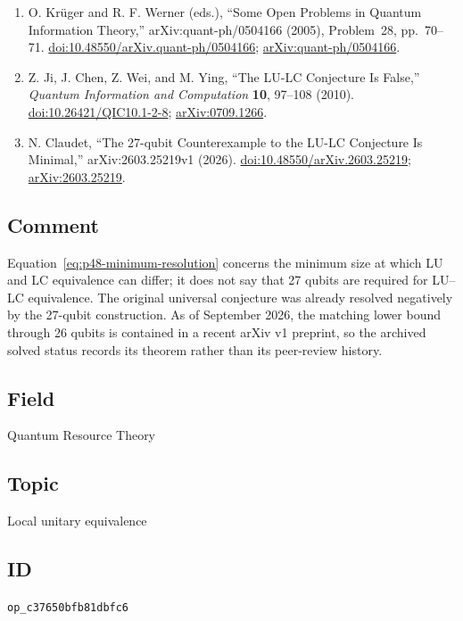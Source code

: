 \begin{enumerate}[label={},leftmargin=4.8em,labelsep=0.5em]
  \footnotesize
  \item[\textup{[KW05]}]\label{ref:p48-krueger-werner}
  O. Kr\"uger and R. F. Werner (eds.),
  ``Some Open Problems in Quantum Information Theory,''
  arXiv:quant-ph/0504166 (2005), Problem~28, pp.~70--71.
  \href{https://doi.org/10.48550/arXiv.quant-ph/0504166}{doi:10.48550/arXiv.quant-ph/0504166};
  \href{https://arxiv.org/abs/quant-ph/0504166}{arXiv:quant-ph/0504166}.

  \item[\textup{[JCWY10]}]\label{ref:p48-ji-et-al}
  Z. Ji, J. Chen, Z. Wei, and M. Ying,
  ``The LU-LC Conjecture Is False,''
  \emph{Quantum Information and Computation} \textbf{10}, 97--108 (2010).
  \href{https://doi.org/10.26421/QIC10.1-2-8}{doi:10.26421/QIC10.1-2-8};
  \href{https://arxiv.org/abs/0709.1266}{arXiv:0709.1266}.

  \item[\textup{[Cla26]}]\label{ref:p48-claudet}
  N. Claudet, ``The 27-qubit Counterexample to the LU-LC Conjecture Is
  Minimal,'' arXiv:2603.25219v1 (2026).\newline
  \href{https://doi.org/10.48550/arXiv.2603.25219}{doi:10.48550/arXiv.2603.25219};
  \href{https://arxiv.org/abs/2603.25219}{arXiv:2603.25219}.
\end{enumerate}

\subsection*{Comment}

Equation~\eqref{eq:p48-minimum-resolution} concerns the minimum size at which
LU and LC equivalence can differ; it does not say that 27 qubits are required
for LU--LC equivalence.  The original universal conjecture was already
resolved negatively by the 27-qubit construction.  As of September 2026, the
matching lower bound through 26 qubits is contained in a recent arXiv v1
preprint, so the archived solved status records its theorem rather than its
peer-review history.

\subsection*{Field}

Quantum Resource Theory

\subsection*{Topic}

Local unitary equivalence

\subsection*{ID}

\texttt{op\_c37650bfb81dbfc6}
